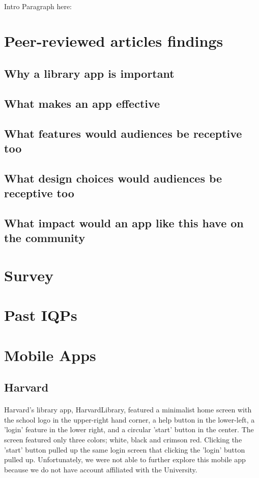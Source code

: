 \paragraph{}
Intro Paragraph here: 
\paragraph{}
\section{Peer-reviewed articles findings}
\subsection{Why a library app is important}
\subsection{What makes an app effective}
\subsection{What features would audiences be receptive too}
\subsection{What design choices would audiences be receptive too}
\subsection{What impact would an app like this have on the community}

\section{Survey}

\section{Past IQPs}

\section{Mobile Apps}
\subsection{Harvard}
\paragraph{}
Harvard's library app, HarvardLibrary, featured a minimalist home screen with the school logo in the upper-right hand corner, a help button in the lower-left, a 'login' feature in the lower right, and a circular 'start' button in the center. The screen featured only three colors; white, black and crimson red. Clicking the 'start' button pulled up the same login screen that clicking the 'login' button pulled up.  Unfortunately, we were not able to further explore this mobile app because we do not have account affiliated with the University. 
